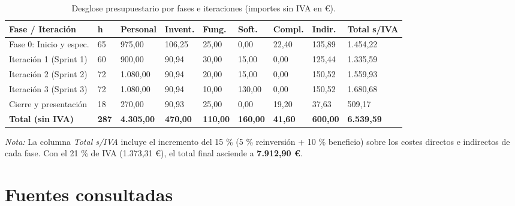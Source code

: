 \documentclass[11pt,a4paper]{article}
\begin{document}
\begin{table}[H]
  \centering
  \caption{Desglose presupuestario por fases e iteraciones (importes sin IVA en €).}
  \label{tab:iteraciones}
  \footnotesize
  \setlength{\tabcolsep}{3.2pt}
  \begin{tabularx}{\linewidth}{@{}Y C{0.7cm} R{1.35cm} R{1.15cm} R{1.1cm} R{1.15cm} R{1.05cm} R{1.15cm} R{1.45cm}@{}}
    \toprule
    \textbf{Fase / Iteración} & \textbf{h} & \textbf{Personal} & \textbf{Invent.} & \textbf{Fung.} & \textbf{Soft.} & \textbf{Compl.} & \textbf{Indir.} & \textbf{Total s/IVA} \\
    \midrule
    Fase 0: Inicio y espec. & 65 & 975,00 & 106,25 & 25,00 & 0,00 & 22,40 & 135,89 & 1.454,22 \\
    Iteración 1 (Sprint 1) & 60 & 900,00 & 90,94 & 30,00 & 15,00 & 0,00 & 125,44 & 1.335,59 \\
    Iteración 2 (Sprint 2) & 72 & 1.080,00 & 90,94 & 20,00 & 15,00 & 0,00 & 150,52 & 1.559,93 \\
    Iteración 3 (Sprint 3) & 72 & 1.080,00 & 90,94 & 10,00 & 130,00 & 0,00 & 150,52 & 1.680,68 \\
    Cierre y presentación & 18 & 270,00 & 90,93 & 25,00 & 0,00 & 19,20 & 37,63 & 509,17 \\
    \midrule
    \textbf{Total (sin IVA)} & \textbf{287} & \textbf{4.305,00} & \textbf{470,00} & \textbf{110,00} & \textbf{160,00} & \textbf{41,60} & \textbf{600,00} & \textbf{6.539,59} \\
    \bottomrule
  \end{tabularx}
  \vspace{3pt}
  {\footnotesize\color{avamuted}\textit{Nota:} La columna \textit{Total s/IVA} incluye el incremento del 15 \% (5 \% reinversión + 10 \% beneficio) sobre los costes directos e indirectos de cada fase. Con el 21 \% de IVA (1.373,31 €), el total final asciende a \textbf{7.912,90 €}.}
\end{table}

\section{Fuentes consultadas}
\end{document}
